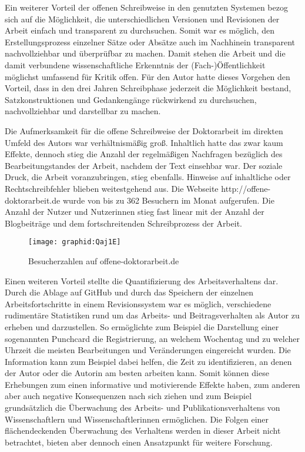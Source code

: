 Ein weiterer Vorteil der offenen Schreibweise in den genutzten Systemen bezog sich auf die Möglichkeit, die unterschiedlichen Versionen und Revisionen der Arbeit einfach und transparent zu durchsuchen. Somit war es möglich, den Erstellungsprozess einzelner Sätze oder Absätze auch im Nachhinein transparent nachvollziehbar und überprüfbar zu machen. Damit stehen die Arbeit und die damit verbundene wissenschaftliche Erkenntnis der (Fach-)Öffentlichkeit möglichst umfassend für Kritik offen. Für den Autor hatte dieses Vorgehen den Vorteil, dass in den drei Jahren Schreibphase jederzeit die Möglichkeit bestand, Satzkonstruktionen und Gedankengänge rückwirkend zu durchsuchen, nachvollziehbar und darstellbar zu machen.

Die Aufmerksamkeit für die offene Schreibweise der Doktorarbeit im direkten Umfeld des Autors war verhältnismäßig groß. Inhaltlich hatte das zwar kaum Effekte, dennoch stieg die Anzahl der regelmäßigen Nachfragen bezüglich des Bearbeitungstandes der Arbeit, nachdem der Text einsehbar war. Der soziale Druck, die Arbeit voranzubringen, stieg ebenfalls. Hinweise auf inhaltliche oder Rechtschreibfehler blieben weitestgehend aus. Die Webseite http://offene-doktorarbeit.de wurde von bis zu 362 Besuchern im Monat aufgerufen. Die Anzahl der Nutzer und Nutzerinnen stieg fast linear mit der Anzahl der Blogbeiträge und dem fortschreitenden Schreibprozess der Arbeit.

\begin{figure}[h!]
\texttt{[image: graphid:Qaj1E]}
\caption{Besucherzahlen auf offene-doktorarbeit.de}
\end{figure}

Einen weiteren Vorteil stellte die Quantifizierung des Arbeitsverhaltens dar. Durch die Ablage auf GitHub und durch das Speichern der einzelnen Arbeitsfortschritte in einem Revisionssystem war es möglich, verschiedene rudimentäre Statistiken rund um das Arbeits- und Beitragsverhalten als Autor zu erheben und darzustellen. So ermöglichte zum Beispiel die Darstellung einer sogenannten Punchcard die Registrierung, an welchem Wochentag und zu welcher Uhrzeit die meisten Bearbeitungen und Veränderungen eingereicht wurden. Die Information kann zum Beispiel dabei helfen, die Zeit zu identifizieren, an denen der Autor oder die Autorin am besten arbeiten kann. Somit können diese Erhebungen zum einen informative und motivierende Effekte haben, zum anderen aber auch negative Konsequenzen nach sich ziehen und zum Beispiel grundsätzlich die Überwachung des Arbeits- und Publikationsverhaltens von Wissenschaftlern und Wissenschaftlerinnen ermöglichen. Die Folgen einer flächendeckenden Überwachung des Verhaltens werden in dieser Arbeit nicht betrachtet, bieten aber dennoch einen Ansatzpunkt für weitere Forschung.

